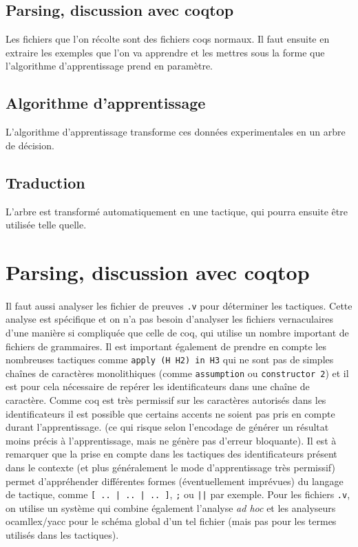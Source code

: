   \subsection{Parsing, discussion avec coqtop}
  Les fichiers que l'on récolte sont des fichiers coqs normaux. Il faut ensuite en extraire les exemples que l'on va apprendre et les mettres sous la forme que l'algorithme d'apprentissage prend en paramètre.

  \subsection{Algorithme d'apprentissage} 
  L'algorithme d'apprentissage transforme ces données experimentales en un arbre de décision.

  \subsection{Traduction}
  L'arbre est transformé automatiquement en une tactique, qui pourra ensuite être utilisée telle quelle.


  \section{Parsing, discussion avec coqtop}
\paragraph{} Il faut aussi analyser les fichier de preuves {\tt .v} pour déterminer les tactiques. Cette analyse est spécifique et on n'a pas besoin d'analyser les fichiers vernaculaires d'une manière si compliquée que celle de coq, qui utilise un nombre important de fichiers de grammaires. Il est important également de prendre en compte les nombreuses tactiques comme {\tt apply (H H2) in H3} qui ne sont pas de simples chaînes de caractères monolithiques (comme {\tt assumption} ou {\tt constructor 2}) et il est pour cela nécessaire de repérer les identificateurs dans une chaîne de caractère. Comme coq est très permissif sur les caractères autorisés dans les identificateurs il est possible que certains accents ne soient pas pris en compte durant l'apprentissage. (ce qui risque selon l'encodage de générer un résultat moins précis à l'apprentissage, mais ne génère pas d'erreur bloquante). Il est à remarquer que la prise en compte dans les tactiques des identificateurs présent dans le contexte (et plus généralement le mode d'apprentissage très permissif) permet d'appréhender différentes formes (éventuellement imprévues) du langage de tactique, comme {\tt [ .. | .. | .. ]}, {\tt ;} ou {\tt ||} par exemple. Pour les fichiers {\tt .v}, on utilise un système qui combine également l'analyse \textit{ad hoc} et les analyseurs ocamllex/yacc pour le schéma global d'un tel fichier (mais pas pour les termes utilisés dans les tactiques).
  
